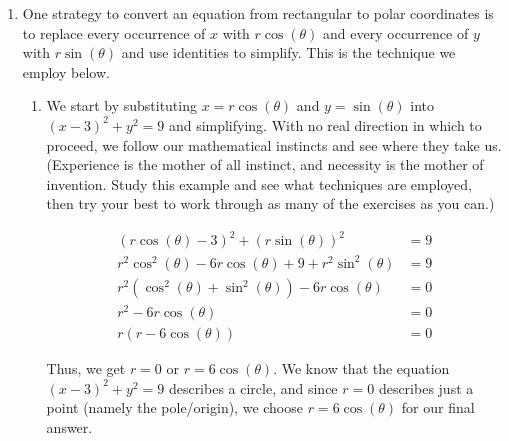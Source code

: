 {
\begin{enumerate}

\item  One strategy to convert an equation from rectangular to polar coordinates is to replace every occurrence of $x$ with $r\cos(\theta)$ and every occurrence of $y$ with $r\sin(\theta)$ and use identities to simplify.  This is the technique we employ below.

\begin{enumerate}

\item We start by substituting  $x = r\cos(\theta)$ and $y = \sin(\theta)$ into $(x-3)^2 + y^2 = 9$ and simplifying.  With no real direction in which to proceed, we follow our mathematical instincts and see where they take us. (Experience is the mother of all instinct, and necessity is the mother of invention.  Study this example and see what techniques are employed, then try your best to work through as many of the exercises as you can.)

\noindent\hskip-40pt\begin{minipage}{\textwidth+40pt}
\begin{align*}
(r\cos(\theta) - 3)^2+ (r\sin(\theta))^2 & =9\\
r^2\cos^2(\theta) - 6 r\cos(\theta) + 9 + r^2 \sin^{2}(\theta) & =9\\
r^2\left(\cos^2(\theta) + \sin^{2}(\theta)\right) - 6 r\cos(\theta) & =0 \tag*{(Subtract $9$ from both sides.)}\\
r^2 - 6 r\cos(\theta)& =0 \tag*{(Since $\cos^2(\theta) + \sin^2(\theta) = 1$)} \\
r(r - 6 \cos(\theta))& =0 \tag*{(Factor.)}
\end{align*}
\end{minipage}

\medskip

Thus, we get $r = 0$ or $r = 6\cos(\theta)$.  We know that the equation $(x-3)^2 + y^2 = 9$ describes a circle, and since $r=0$ describes just a point (namely the pole/origin), we choose $r = 6\cos(\theta)$ for our final answer. 



\end{enumerate}
\end{enumerate}}
